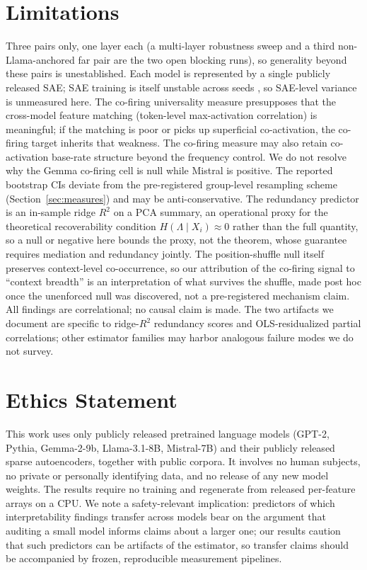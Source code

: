\documentclass[11pt]{article}
\begin{document}
\section*{Limitations}
Three pairs only, one layer each (a multi-layer robustness sweep and a third non-Llama-anchored far pair
are the two open blocking runs), so generality beyond these pairs is unestablished. Each model is
represented by a single publicly released SAE; SAE training is itself unstable across seeds
\citep{paulo2025different}, so SAE-level variance is unmeasured here. The co-firing universality measure
presupposes that the cross-model feature matching (token-level max-activation correlation) is meaningful;
if the matching is poor or picks up superficial co-activation, the co-firing target inherits that
weakness. The co-firing measure may also retain co-activation base-rate structure beyond the frequency
control. We do not resolve why the Gemma co-firing cell is null while Mistral is positive. The reported
bootstrap CIs deviate from the pre-registered group-level resampling scheme (Section~\ref{sec:measures})
and may be anti-conservative.
The redundancy predictor is an in-sample ridge $R^2$ on a PCA summary, an operational proxy for the
theoretical recoverability condition $H(\Lambda \mid X_i)\approx 0$ rather than the full quantity, so a
null or negative here bounds the proxy, not the theorem, whose guarantee requires mediation and
redundancy jointly. The position-shuffle null itself preserves context-level co-occurrence, so our
attribution of the co-firing signal to ``context breadth'' is an interpretation of what survives the
shuffle, made post hoc once the unenforced null was discovered, not a pre-registered mechanism claim.
All findings are correlational; no causal claim is made. The two artifacts we
document are specific to ridge-$R^2$ redundancy scores and OLS-residualized partial correlations; other
estimator families may harbor analogous failure modes we do not survey.

\section*{Ethics Statement}
This work uses only publicly released pretrained language models (GPT-2, Pythia, Gemma-2-9b,
Llama-3.1-8B, Mistral-7B) and their publicly released sparse autoencoders, together with public corpora.
It involves no human subjects, no private or personally identifying data, and no release of any new model
weights. The results require no training and regenerate from released per-feature arrays on a CPU. We
note a safety-relevant implication: predictors of which interpretability findings transfer across models
bear on the argument that auditing a small model informs claims about a larger one; our results caution
that such predictors can be artifacts of the estimator, so transfer claims should be accompanied by
frozen, reproducible measurement pipelines.
\end{document}

